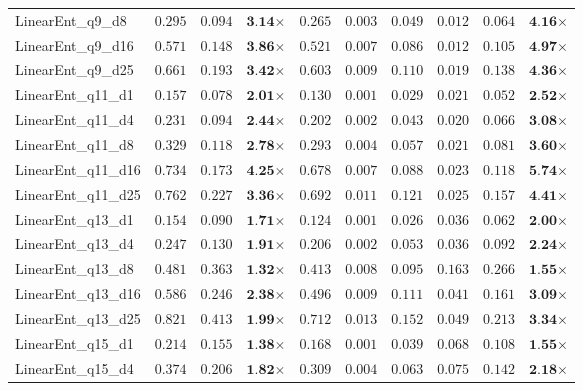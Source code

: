 \begin{table*}[t]
{\begin{tabular}{| l || r r c || r r r r r c |}
LinearEnt\_q9\_d8 & $0.295$ & $0.094$ & $\textbf{3.14}$$\times$ & $0.265$ & $0.003$ & $0.049$ & $0.012$ & $0.064$ & $\textbf{4.16}$$\times$ \\
LinearEnt\_q9\_d16 & $0.571$ & $0.148$ & $\textbf{3.86}$$\times$ & $0.521$ & $0.007$ & $0.086$ & $0.012$ & $0.105$ & $\textbf{4.97}$$\times$ \\
LinearEnt\_q9\_d25 & $0.661$ & $0.193$ & $\textbf{3.42}$$\times$ & $0.603$ & $0.009$ & $0.110$ & $0.019$ & $0.138$ & $\textbf{4.36}$$\times$ \\
LinearEnt\_q11\_d1 & $0.157$ & $0.078$ & $\textbf{2.01}$$\times$ & $0.130$ & $0.001$ & $0.029$ & $0.021$ & $0.052$ & $\textbf{2.52}$$\times$ \\
LinearEnt\_q11\_d4 & $0.231$ & $0.094$ & $\textbf{2.44}$$\times$ & $0.202$ & $0.002$ & $0.043$ & $0.020$ & $0.066$ & $\textbf{3.08}$$\times$ \\
LinearEnt\_q11\_d8 & $0.329$ & $0.118$ & $\textbf{2.78}$$\times$ & $0.293$ & $0.004$ & $0.057$ & $0.021$ & $0.081$ & $\textbf{3.60}$$\times$ \\
LinearEnt\_q11\_d16 & $0.734$ & $0.173$ & $\textbf{4.25}$$\times$ & $0.678$ & $0.007$ & $0.088$ & $0.023$ & $0.118$ & $\textbf{5.74}$$\times$ \\
LinearEnt\_q11\_d25 & $0.762$ & $0.227$ & $\textbf{3.36}$$\times$ & $0.692$ & $0.011$ & $0.121$ & $0.025$ & $0.157$ & $\textbf{4.41}$$\times$ \\
LinearEnt\_q13\_d1 & $0.154$ & $0.090$ & $\textbf{1.71}$$\times$ & $0.124$ & $0.001$ & $0.026$ & $0.036$ & $0.062$ & $\textbf{2.00}$$\times$ \\
LinearEnt\_q13\_d4 & $0.247$ & $0.130$ & $\textbf{1.91}$$\times$ & $0.206$ & $0.002$ & $0.053$ & $0.036$ & $0.092$ & $\textbf{2.24}$$\times$ \\
LinearEnt\_q13\_d8 & $0.481$ & $0.363$ & $\textbf{1.32}$$\times$ & $0.413$ & $0.008$ & $0.095$ & $0.163$ & $0.266$ & $\textbf{1.55}$$\times$ \\
LinearEnt\_q13\_d16 & $0.586$ & $0.246$ & $\textbf{2.38}$$\times$ & $0.496$ & $0.009$ & $0.111$ & $0.041$ & $0.161$ & $\textbf{3.09}$$\times$ \\
LinearEnt\_q13\_d25 & $0.821$ & $0.413$ & $\textbf{1.99}$$\times$ & $0.712$ & $0.013$ & $0.152$ & $0.049$ & $0.213$ & $\textbf{3.34}$$\times$ \\
LinearEnt\_q15\_d1 & $0.214$ & $0.155$ & $\textbf{1.38}$$\times$ & $0.168$ & $0.001$ & $0.039$ & $0.068$ & $0.108$ & $\textbf{1.55}$$\times$ \\
LinearEnt\_q15\_d4 & $0.374$ & $0.206$ & $\textbf{1.82}$$\times$ & $0.309$ & $0.004$ & $0.063$ & $0.075$ & $0.142$ & $\textbf{2.18}$$\times$ \\

\end{tabular}}
\end{table*}
